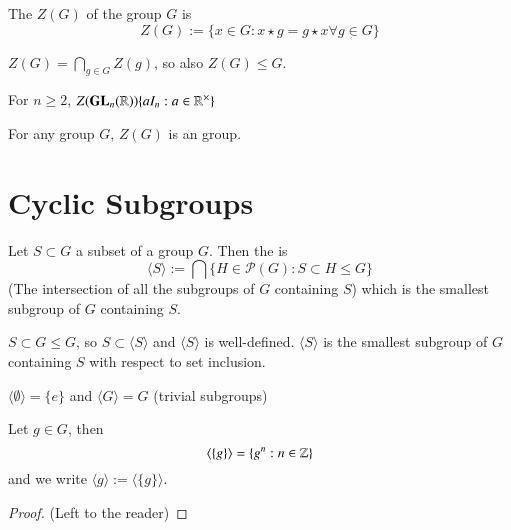 \begin{definition}
    The  $Z(G)$ of the group $G$ is \begin{equation}
        Z(G) := \{x \in G:x\star g = g \star x \forall g \in G\}
    \end{equation}
\end{definition}

\begin{proposition}
    $Z(G) = \bigcap_{g \in G} Z(g)$, so also $Z(G) \leq G$.
\end{proposition}

\begin{exercise}
    For $n \geq 2$, $Z(\mathbf{GL}_n(\mathbb R)) \{aI_n: a \in \mathbb R^{\times}\}$
\end{exercise}

\begin{remark}
    For any group $G$, $Z(G)$ is an  group.
\end{remark}


\section{ Cyclic Subgroups}


\begin{definition}
    Let $S \subset G$ a subset of a group $G$. Then the  is \begin{equation}
        \langle S\rangle := \bigcap\{H \in \mathcal{P}(G): S \subset H \leq G\}
    \end{equation}
    (The intersection of all the subgroups of $G$ containing $S$) which is the smallest subgroup of $G$ containing $S$.
    \begin{note}
        $S \subset G \leq G$, so $S \subset \langle S \rangle$ and $\langle S \rangle$ is well-defined. $\langle S \rangle$ is the smallest subgroup of $G$ containing $S$ with respect to set inclusion.
    \end{note}
\end{definition}

\begin{example}
    $\langle \emptyset\rangle = \{e\}$ and $\langle G \rangle = G$ (trivial subgroups)
\end{example}

\begin{proposition}
    Let $g \in G$, then \begin{equation}
        \langle \{g\}\rangle = \{g^n:n \in \mathbb Z\}
    \end{equation}
    and we write $\langle g \rangle := \langle \{g\}\rangle$.
    \begin{proof}
        (Left to the reader)
    \end{proof}
\end{proposition}

